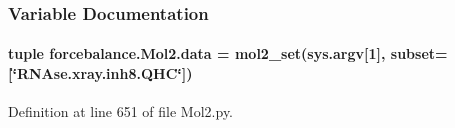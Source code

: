 \subsubsection{Variable Documentation}
\hypertarget{namespaceforcebalance_1_1Mol2_aa0ea6835b13b32f3c9dafbfc769fceda}{
\paragraph[{data}]{\setlength{\rightskip}{0pt plus 5cm}tuple forcebalance.\-Mol2.\-data = {\bf mol2\-\_\-set}(sys.\-argv\mbox{[}1\mbox{]}, subset=\mbox{[}\char`\"{}R\-N\-Ase.\-xray.\-inh8.\-Q\-H\-C\char`\"{}\mbox{]})}}\label{namespaceforcebalance_1_1Mol2_aa0ea6835b13b32f3c9dafbfc769fceda}


Definition at line 651 of file Mol2.\-py.


